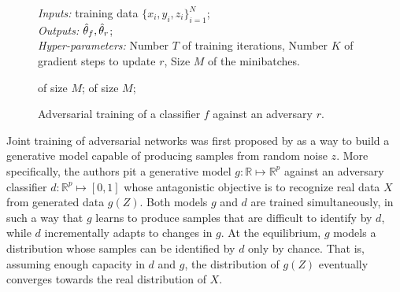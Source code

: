 \documentclass[twocolumn,superscriptaddress,aps]{revtex4-1}
\theoremstyle{plain}
\begin{document}
\begin{figure}
    \begin{minipage}{\linewidth}
    \begin{algorithm}[H]
    \caption{Adversarial training of a classifier $f$ against an adversary $r$.}

    \begin{flushleft}
        {\it Inputs:} training data $\{ x_i, y_i, z_i \}_{i=1}^N$;\\
        {\it Outputs:} $\smash{\hat\theta_f}, \smash{\hat\theta_r}$;\\
        {\it Hyper-parameters:} Number $T$ of training iterations,
                                Number $K$ of gradient steps to update $r$,
                                Size $M$ of the minibatches.
    \end{flushleft}

    \label{alg:adversarial-training}
    \begin{algorithmic}[1]
             
                 of size $M$;
            \EndFor
             of size $M$; 
        \EndFor
    \end{algorithmic}
    \end{algorithm}
    \end{minipage}
\end{figure}

Joint training of adversarial networks was first proposed by \citep{goodfellow2014generative} as a
way to build a generative model capable of producing samples from random noise
$z$. More specifically, the authors pit a generative model $g:
\mathbb{R} \mapsto \mathbb{R}^p$ against an adversary classifier $d :
\mathbb{R}^p \mapsto [0, 1]$ whose antagonistic objective is to recognize
real data $X$ from generated data $g(Z)$. Both models $g$ and $d$ are trained
simultaneously, in such a way that $g$ learns to produce samples that are
difficult to identify by $d$, while $d$ incrementally adapts to changes in $g$.
At the equilibrium, $g$ models a distribution whose samples can be identified by
$d$ only by chance. That is, assuming enough capacity in $d$ and  $g$, the
distribution of $g(Z)$ eventually converges towards the real distribution
of $X$.
\end{document}
